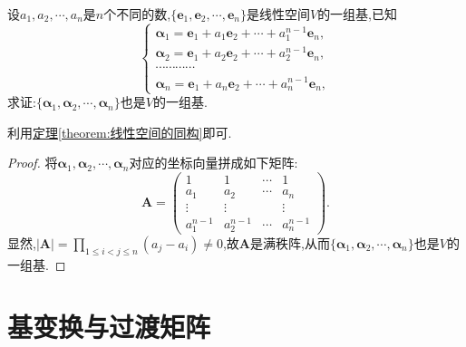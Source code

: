 \documentclass[lang=cn,newtx,10pt,scheme=chinese]{elegantbook}
\begin{document}
\begin{example}\label{example:3.110.1}
设\(a_1,a_2,\cdots,a_n\)是\(n\)个不同的数,\(\{\boldsymbol{e}_1,\boldsymbol{e}_2,\cdots,\boldsymbol{e}_n\}\)是线性空间\(V\)的一组基,已知
\[
\begin{cases}
\boldsymbol{\alpha}_1=\boldsymbol{e}_1 + a_1\boldsymbol{e}_2+\cdots + a_1^{n - 1}\boldsymbol{e}_n,\\
\boldsymbol{\alpha}_2=\boldsymbol{e}_1 + a_2\boldsymbol{e}_2+\cdots + a_2^{n - 1}\boldsymbol{e}_n,\\
\cdots\cdots\cdots\cdots\\
\boldsymbol{\alpha}_n=\boldsymbol{e}_1 + a_n\boldsymbol{e}_2+\cdots + a_n^{n - 1}\boldsymbol{e}_n,
\end{cases}
\]
求证:\(\{\boldsymbol{\alpha}_1,\boldsymbol{\alpha}_2,\cdots,\boldsymbol{\alpha}_n\}\)也是\(V\)的一组基.
\end{example}
\begin{note}
    利用\hyperref[theorem:线性空间的同构]{定理\ref{theorem:线性空间的同构}}即可.
\end{note}
\begin{proof}
    将\(\boldsymbol{\alpha}_1,\boldsymbol{\alpha}_2,\cdots,\boldsymbol{\alpha}_n\)对应的坐标向量拼成如下矩阵:
\[
\boldsymbol{A}=\begin{pmatrix}
1&1&\cdots&1\\
a_1&a_2&\cdots&a_n\\
\vdots&\vdots&&\vdots\\
a_1^{n - 1}&a_2^{n - 1}&\cdots&a_n^{n - 1}
\end{pmatrix}.
\]
显然,\(|\boldsymbol{A}|=\prod_{1\leq i<j\leq n}(a_j - a_i)\neq0\),故\(\boldsymbol{A}\)是满秩阵,从而\(\{\boldsymbol{\alpha}_1,\boldsymbol{\alpha}_2,\cdots,\boldsymbol{\alpha}_n\}\)也是\(V\)的一组基. 
\end{proof}

\section{基变换与过渡矩阵}
\end{document}
